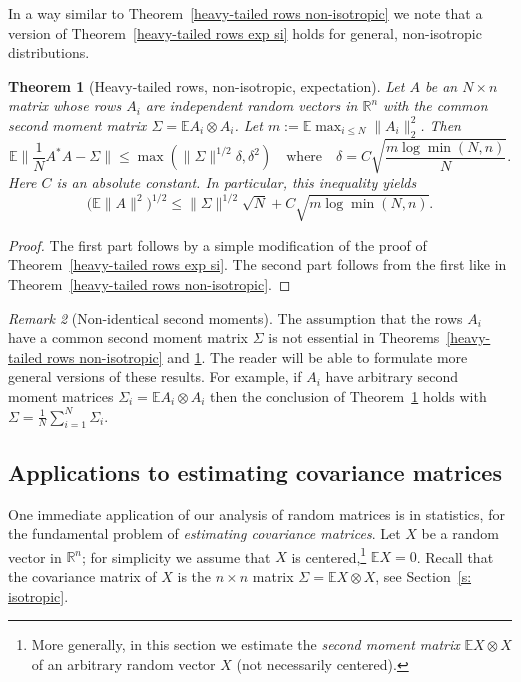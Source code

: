\documentclass[10pt, openany]{book}
\newtheorem{theorem}{Theorem}[chapter]
\theoremstyle{remark}
\newtheorem{remark}[theorem]{Remark}
\def \R {\mathbb{R}}
\def \E {\mathbb{E}}
\def \d {\delta}
\def \S {\Sigma}
\begin{document}
In a way similar to Theorem~\ref{heavy-tailed rows non-isotropic} we note that a version 
of Theorem~\ref{heavy-tailed rows exp si} holds for general, non-isotropic distributions.

\begin{theorem}[Heavy-tailed rows, non-isotropic, expectation]			\label{heavy-tailed rows exp si non-isotropic}
  Let $A$ be an $N \times n$ matrix whose rows $A_i$ are independent
  random vectors in $\R^n$ with the common second moment matrix $\Sigma = \E A_i \otimes A_i$. 
  Let $m := \E \max_{i \le N} \|A_i\|_2^2$.  
  Then
  $$
  \E \big\| \frac{1}{N}A^*A-\Sigma \big\| \le \max(\|\Sigma\|^{1/2}\d, \d^2)
  \quad \text{where} \quad
  \d = C \sqrt{\frac{m \log \min(N,n)}{N}}.
  $$
  Here $C$ is an absolute constant.
  In particular, this inequality yields
  $$  
  \big( \E \|A\|^2 \big)^{1/2} \le \|\Sigma\|^{1/2} \sqrt{N} + C \sqrt{m \log \min(N,n)}.
  $$
\end{theorem}

\begin{proof}
The first part follows by a simple modification of the proof of Theorem~\ref{heavy-tailed rows exp si}.
The second part follows from the first like in Theorem~\ref{heavy-tailed rows non-isotropic}.
\end{proof}


\begin{remark}[Non-identical second moments]						\label{r: different second moments}
  The assumption that the rows $A_i$ have a common
  second moment matrix $\S$ is not essential in Theorems~\ref{heavy-tailed rows non-isotropic}
  and \ref{heavy-tailed rows exp si non-isotropic}. 
  The reader will be able to formulate more general versions of these results. 
  For example, if $A_i$ have arbitrary second moment matrices $\Sigma_i = \E A_i \otimes A_i$ 
  then the conclusion of Theorem~\ref{heavy-tailed rows exp si non-isotropic} 
  holds with $\S = \frac{1}{N} \sum_{i=1}^N \Sigma_i$. 
\end{remark}






\subsection{Applications to estimating covariance matrices}			
\label{s: covariance}

One immediate application of our analysis of random matrices is in statistics, 
for the fundamental problem of {\em estimating covariance matrices}. 
Let $X$ be a random vector in $\R^n$; for simplicity 
we assume that $X$ is centered,\footnote{More generally, in this section we estimate 
  the {\em second moment matrix} $\E X \otimes X$ of an arbitrary random vector $X$ 
  (not necessarily centered).}
$\E X = 0$. Recall that the covariance matrix of 
$X$ is the $n \times n$ matrix $\Sigma = \E X \otimes X$, see Section~\ref{s: isotropic}.
\end{document}
